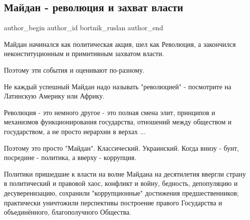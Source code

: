  
 
 
 
 
 
\subsection{Майдан - революция и захват власти}
\label{sec:21_11_2021.fb.bortnik_ruslan.1.maidan_revolucia_zahvat_vlasti}
 
\ifcmt
 author_begin
   author_id bortnik_ruslan
 author_end
\fi

Майдан начинался как политическая акция, шел как Революция, а закончился
неконституционным и примитивным захватом власти. 

Поэтому эти события и оценивают по-разному.  

Не каждый успешный Майдан надо называть "революцией" - посмотрите на Латинскую
Америку или Африку.

Революция - это немного другое - это полная смена элит, принципов и механизмов
функционирования государства, отношений между обществом и государством, а не
просто иерархии в верхах ...

Поэтому это просто "Майдан". Классический. Украинский. Когда внизу - бунт,
посредине  - политика, а вверху - коррупция. 

Политики пришедшие к власти на волне Майдана на десятилетия ввергли страну в
политический  и правовой хаос, конфликт и войну, бедность, депопуляцию и
десуверенизацию, сохранили "коррупционные" достижения предшественников;
практически уничтожили перспективы построение правого Государства и
объединённого, благополучного Общества.

